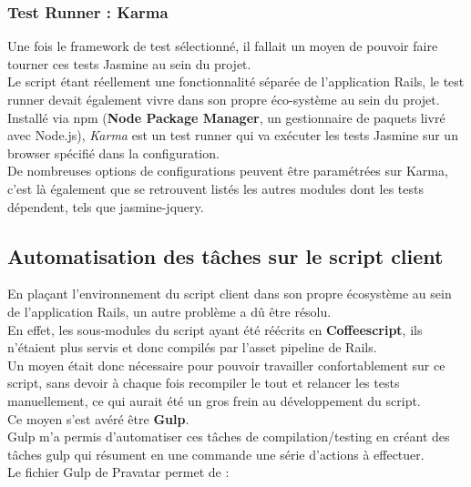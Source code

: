 \documentclass{report}
\begin{document}
        \subsubsection{Test Runner : Karma}
        \label{subs:Test Runner : Karma}

          Une fois le framework de test sélectionné, il fallait un moyen de pouvoir faire tourner ces tests Jasmine au sein du projet.\\

          Le script étant réellement une fonctionnalité séparée de l'application Rails, le test runner devait également vivre dans son propre éco-système au sein du projet.\\

          Installé via npm (\textbf{Node Package Manager}, un gestionnaire de paquets livré avec Node.js), \textit{Karma} est un test runner qui va exécuter les tests Jasmine sur un browser spécifié dans la configuration.\\
          De nombreuses options de configurations peuvent être paramétrées sur Karma, c'est là également que se retrouvent listés les autres modules dont les tests dépendent, tels que jasmine-jquery.\\

      \subsection{Automatisation des tâches sur le script client}
      \label{subs:Automatisation des tâches sur le script client}

        En plaçant l'environnement du script client dans son propre écosystème au sein de l'application Rails, un autre problème a dû être résolu.\\

        En effet, les sous-modules du script ayant été réécrits en \textbf{Coffeescript}, ils n'étaient plus servis et donc compilés par l'asset pipeline de Rails.\\
        Un moyen était donc nécessaire pour pouvoir travailler confortablement sur ce script, sans devoir à chaque fois recompiler le tout et relancer les tests manuellement,
        ce qui aurait été un gros frein au développement du script.\\

        Ce moyen s'est avéré être \textbf{Gulp}.\\
        Gulp m'a permis d'automatiser ces tâches de compilation/testing en créant des tâches gulp qui résument en une commande une série d'actions à effectuer.\\
        Le fichier Gulp de Pravatar permet de :\\
\end{document}
